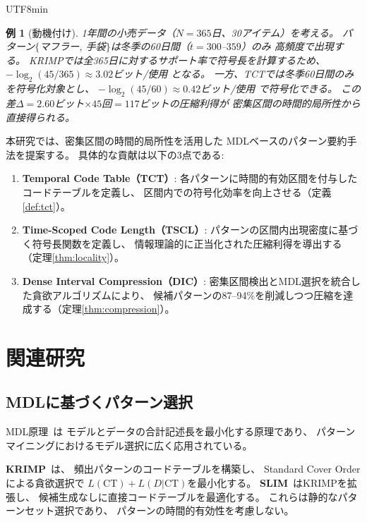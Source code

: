 \documentclass[11pt,a4paper]{article}
\newtheorem{example}{例}
\begin{document}
\begin{CJK}{UTF8}{min}
\begin{example}[動機付け]
1年間の小売データ（$N{=}365$日、30アイテム）を考える。
パターン$\{$マフラー, 手袋$\}$は冬季の60日間（$t{=}300$--$359$）のみ
高頻度で出現する。
KRIMPでは全365日に対するサポート率で符号長を計算するため、
$-\log_2(45/365) \approx 3.02$ビット/使用 となる。
一方、TCTでは冬季60日間のみを符号化対象とし、
$-\log_2(45/60) \approx 0.42$ビット/使用 で符号化できる。
この差$\Delta = 2.60$ビット$\times 45$回$= 117$ビットの圧縮利得が
密集区間の時間的局所性から直接得られる。
\end{example}

本研究では、密集区間の時間的局所性を活用した
MDLベースのパターン要約手法を提案する。
具体的な貢献は以下の3点である:

\begin{enumerate}[label=(\arabic*)]
  \item \textbf{Temporal Code Table（TCT）}:
    各パターンに時間的有効区間を付与したコードテーブルを定義し、
    区間内での符号化効率を向上させる（定義\ref{def:tct}）。
  \item \textbf{Time-Scoped Code Length（TSCL）}:
    パターンの区間内出現密度に基づく符号長関数を定義し、
    情報理論的に正当化された圧縮利得を導出する（定理\ref{thm:locality}）。
  \item \textbf{Dense Interval Compression（DIC）}:
    密集区間検出とMDL選択を統合した貪欲アルゴリズムにより、
    候補パターンの87--94\%を削減しつつ圧縮を達成する（定理\ref{thm:compression}）。
\end{enumerate}


\section{関連研究}\label{sec:related}

\subsection{MDLに基づくパターン選択}

MDL原理~\cite{rissanen1978modeling,grunwald2007minimum}は
モデルとデータの合計記述長を最小化する原理であり、
パターンマイニングにおけるモデル選択に広く応用されている。

\textbf{KRIMP}~\cite{vreeken2011krimp}は、
頻出パターンのコードテーブルを構築し、
Standard Cover Orderによる貪欲選択で
$L(\text{CT}) + L(D|\text{CT})$を最小化する。
\textbf{SLIM}~\cite{smets2012slim}はKRIMPを拡張し、
候補生成なしに直接コードテーブルを最適化する。
これらは静的なパターンセット選択であり、
パターンの時間的有効性を考慮しない。


\end{CJK}
\end{document}
